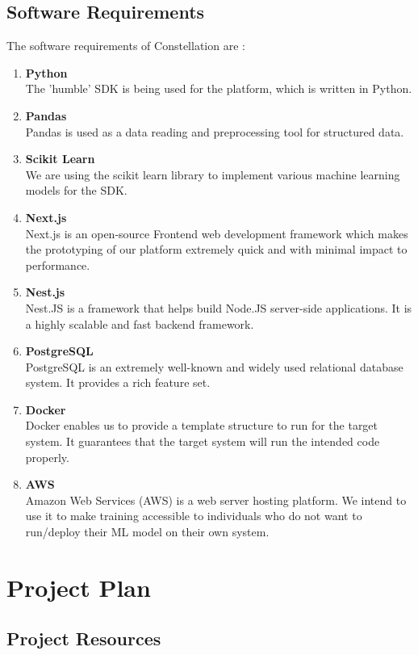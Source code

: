 \documentclass[12pt,a4paper]{report}     %
\begin{document}
\begin{normalsize}
{\subsection{Software Requirements}
The software requirements of Constellation are :
\begin{enumerate}
\item \textbf{Python}\\
The 'humble' SDK is being used for the platform, which is written in Python.
\item \textbf{Pandas}\\
Pandas is used as a data reading and preprocessing tool for structured data.
\item \textbf{Scikit Learn}\\
We are using the scikit learn library to implement various machine learning models for the SDK.
\item \textbf{Next.js}\\
Next.js is an open-source Frontend web development framework which makes the prototyping of our platform extremely quick and with minimal impact to performance.
\item \textbf{Nest.js}\\
Nest.JS is a framework that helps build Node.JS server-side applications. It is a highly scalable and fast backend framework.
\item \textbf{PostgreSQL}\\
PostgreSQL is an extremely well-known and widely used relational database system. It provides a rich feature set.
\item \textbf{Docker}\\
Docker enables us to provide a template structure to run for the target system. It guarantees that the target system will run the intended code properly.
\item \textbf{AWS}\\
Amazon Web Services (AWS) is a web server hosting platform. We intend to use it to make training accessible to individuals who do not want to run/deploy their ML model on their own system.
\end{enumerate}
\section{Project Plan}
\subsection{Project Resources}
}
\end{normalsize}
\end{document}
